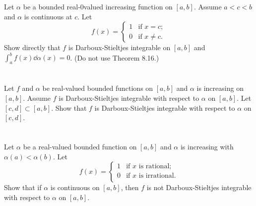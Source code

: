 \documentclass[]{article}
\begin{document}
\newpage
\section{}
Let $\alpha$ be a bounded real-0valued increasing function on $[a,b]$. 
Assume $a < c < b$ and $\alpha$ is continuous at $c$. 
Let \[
    f(x) = \begin{cases}
        1   &\text{if } x = c;\\
        0   &\text{if } x \neq c.
    \end{cases}
\] Show directly that $f$ is Darboux-Stieltjes integrable on $[a,b]$ and $\int_{a}^{b} f(x) \dd{\alpha(x)} = 0$. 
(Do not use Theorem 8.16.)










\newpage
\section{}
Let $f$ and $\alpha$ be real-valued bounded functions on $[a,b]$ and $\alpha$ is increasing on $[a,b]$. 
Assume $f$ is Darboux-Stieltjes integrable with respect to $\alpha$ on $[a,b]$. 
Let $[c,d] \subset [a,b]$. 
Show that $f$ is Darboux-Stieltjes integrable with respect to $\alpha$ on $[c,d]$.













\newpage
\section{}
Let $\alpha$ be a real-valued bounded function on $[a,b]$ and $\alpha$ is increasing with $\alpha(a) < \alpha(b)$. 
Let \[
    f(x) = \begin{cases}
        1   &\text{if $x$ is rational};\\
        0   &\text{if $x$ is irrational}.\\
    \end{cases}
\] Show that if $\alpha$ is continuous on $[a,b]$, then $f$ is not Darboux-Stieltjes integrable with respect to $\alpha$ on $[a,b]$.
\end{document}

